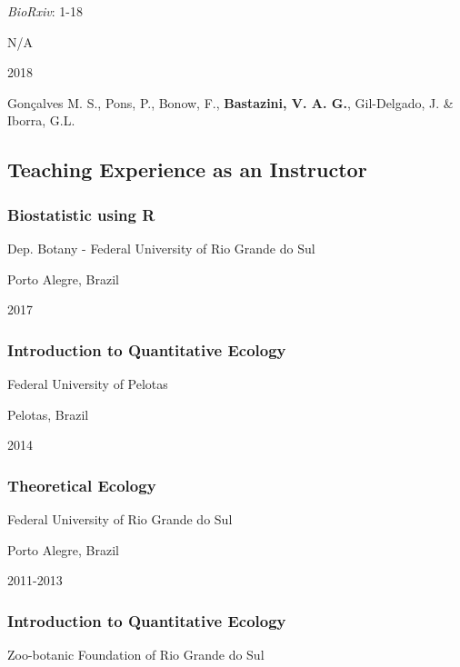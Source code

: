 \documentclass[
]{article}
\begin{document}
\emph{BioRxiv}: 1-18

N/A

2018

Gonçalves M. S., Pons, P., Bonow, F., \textbf{Bastazini, V. A. G.},
Gil-Delgado, J. \& Iborra, G.L.

\hypertarget{teaching-experience-as-an-instructor}{%
\subsection{Teaching Experience as an
Instructor}\label{teaching-experience-as-an-instructor}}

\hypertarget{biostatistic-using-r}{%
\subsubsection{Biostatistic using R}\label{biostatistic-using-r}}

Dep. Botany - Federal University of Rio Grande do Sul

Porto Alegre, Brazil

2017

\hypertarget{introduction-to-quantitative-ecology}{%
\subsubsection{Introduction to Quantitative
Ecology}\label{introduction-to-quantitative-ecology}}

Federal University of Pelotas

Pelotas, Brazil

2014

\hypertarget{theoretical-ecology}{%
\subsubsection{Theoretical Ecology}\label{theoretical-ecology}}

Federal University of Rio Grande do Sul

Porto Alegre, Brazil

2011-2013

\hypertarget{introduction-to-quantitative-ecology-1}{%
\subsubsection{Introduction to Quantitative
Ecology}\label{introduction-to-quantitative-ecology-1}}

Zoo-botanic Foundation of Rio Grande do Sul
\end{document}

